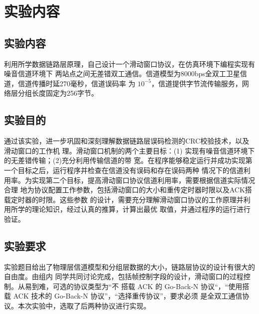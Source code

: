 
\section{实验内容}

\subsection{实验内容}

\par 利用所学数据链路层原理，自己设计一个滑动窗口协议，在仿真环境下编程实现有噪音信道环境下
两站点之间无差错双工通信。信道模型为8000bps全双工卫星信道，信道传播时延270毫秒，信道误码率
为 $10^{-5}$，信道提供字节流传输服务，网络层分组长度固定为256字节。

\subsection{实验目的}

\par 通过该实验，进一步巩固和深刻理解数据链路层误码检测的CRC校验技术，以及滑动窗口的工作机
理。滑动窗口机制的两个主要目标：(1) 实现有噪音信道环境下的无差错传输；(2)充分利用传输信道的带
宽。在程序能够稳定运行并成功实现第一个目标之后，运行程序并检查在信道没有误码和存在误码两种
情况下的信道利用率。为实现第二个目标，提高滑动窗口协议信道利用率，需要根据信道实际情况合理
地为协议配置工作参数，包括滑动窗口的大小和重传定时器时限以及ACK搭载定时器的时限。这些参数
的设计，需要充分理解滑动窗口协议的工作原理并利用所学的理论知识，经过认真的推算，计算出最优
取值，并通过程序的运行进行验证。

\subsection{实验要求}

\par 实验题目给出了物理层信道模型和分组层数据的大小，链路层协议的设计有很大的自由度。由组内
同学共同讨论完成，包括帧控制字段的设计，滑动窗口的过程控制。从易到难，可选的协议类型为“不
搭载 ACK 的 Go-Back-N 协议“，“使用搭载 ACK 技术的 Go-Back-N 协议”，“选择重传协议”，要求必须
是全双工通信协议。本次实验中，选取了后两种协议进行实现。